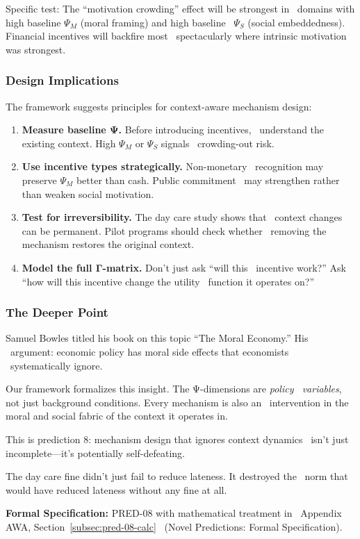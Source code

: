 Specific test: The ``motivation crowding'' effect will be strongest in \
domains with high baseline $\Psi_M$ (moral framing) and high baseline \
$\Psi_S$ (social embeddedness). Financial incentives will backfire most \
spectacularly where intrinsic motivation was strongest.

\subsubsection{Design Implications}

The framework suggests principles for context-aware mechanism design:

\begin{enumerate}
    \item \textbf{Measure baseline Ψ.} Before introducing incentives, \
    understand the existing context. High $\Psi_M$ or $\Psi_S$ signals \
    crowding-out risk.
    
    \item \textbf{Use incentive types strategically.} Non-monetary \
    recognition may preserve $\Psi_M$ better than cash. Public commitment \
    may strengthen rather than weaken social motivation.
    
    \item \textbf{Test for irreversibility.} The day care study shows that \
    context changes can be permanent. Pilot programs should check whether \
    removing the mechanism restores the original context.
    
    \item \textbf{Model the full Γ-matrix.} Don't just ask ``will this \
    incentive work?'' Ask ``how will this incentive change the utility \
    function it operates on?''
\end{enumerate}

\subsubsection{The Deeper Point}

Samuel Bowles titled his book on this topic ``The Moral Economy.'' His \
argument: economic policy has moral side effects that economists \
systematically ignore.

Our framework formalizes this insight. The Ψ-dimensions are \emph{policy \
variables}, not just background conditions. Every mechanism is also an \
intervention in the moral and social fabric of the context it operates in.

This is prediction 8: mechanism design that ignores context dynamics \
isn't just incomplete---it's potentially self-defeating.

The day care fine didn't just fail to reduce lateness. It destroyed the \
norm that would have reduced lateness without any fine at all.

\begin{cross-reference}
\textbf{Formal Specification:} PRED-08 with mathematical treatment in \
Appendix AWA, Section~\ref{subsec:pred-08-calc} \
(Novel Predictions: Formal Specification).
\end{cross-reference}
